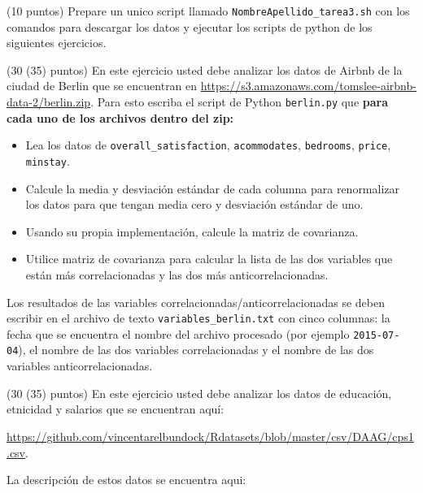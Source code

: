 \documentclass[11pt,letterpaper]{exam}
\begin{document}
\begin{questions}




(10 puntos) 
Prepare un unico script llamado \verb"NombreApellido_tarea3.sh" 
con los comandos para descargar los datos y ejecutar los scripts de python
de los siguientes ejercicios.


(30 (35) puntos) En este ejercicio usted debe analizar los datos de Airbnb
    de la ciudad de Berlin que se encuentran en
    \url{https://s3.amazonaws.com/tomslee-airbnb-data-2/berlin.zip}. 
    Para esto escriba el script de Python \verb"berlin.py" que
    {\bf para cada uno de los archivos dentro del zip:}\\
    \begin{itemize}
    \item {Lea los datos de \verb"overall_satisfaction", \verb"acommodates",
        \verb"bedrooms", \verb"price", \verb"minstay".}
    \item{Calcule la media y desviaci\'on est\'andar de cada columna
      para renormalizar los datos para que tengan media cero y
      desviaci\'on est\'andar de uno.}
    \item{Usando su propia implementaci\'on, calcule la matriz de
      covarianza.}
    \item{Utilice matriz de covarianza para calcular la lista de las
      dos variables que est\'an m\'as correlacionadas y las dos m\'as
      anticorrelacionadas.}
    \end{itemize}
    Los resultados de las variables
    correlacionadas/anticorrelacionadas se deben escribir en el
    archivo de texto \verb"variables_berlin.txt" con cinco columnas: la
    fecha que se encuentra el nombre del archivo procesado (por
    ejemplo \verb"2015-07-04"), el nombre
    de las dos variables correlacionadas y el nombre de las dos
    variables anticorrelacionadas. 




(30 (35) puntos) En este ejercicio usted debe analizar los datos de
educaci\'on, etnicidad y salarios que se encuentran aqu\'i:

\url{https://github.com/vincentarelbundock/Rdatasets/blob/master/csv/DAAG/cps1.csv}.

La descripci\'on de estos datos se encuentra aqui:


\end{questions}
\end{document}
